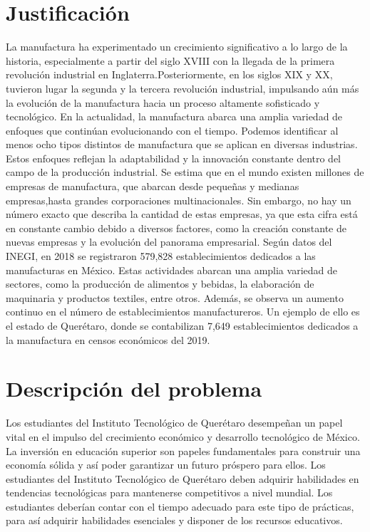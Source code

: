    
    \section{Justificación}
    La manufactura ha experimentado un crecimiento significativo a lo largo de la historia, especialmente a partir del siglo XVIII con la llegada de la primera revolución industrial en Inglaterra.Posteriormente, en los siglos XIX y XX, tuvieron lugar la segunda y la tercera revolución industrial, impulsando aún más la evolución de la manufactura hacia un proceso altamente sofisticado y tecnológico. En la actualidad, la manufactura abarca una amplia variedad de enfoques que continúan evolucionando con el tiempo. Podemos identificar al menos ocho tipos distintos de manufactura que se aplican en diversas industrias. Estos enfoques reflejan la adaptabilidad y la innovación constante dentro del campo de la producción industrial. \cite{Revoluciónindustrial}
    Se estima que en el mundo existen millones de empresas de manufactura, que abarcan desde pequeñas y medianas empresas,hasta grandes corporaciones multinacionales. Sin embargo, no hay un número exacto que describa la cantidad de estas empresas, ya que esta cifra está en constante cambio debido a diversos factores, como la creación constante de nuevas empresas y la evolución del panorama empresarial.
    Según datos del INEGI, en 2018 se registraron 579,828 establecimientos dedicados a las manufacturas en México. Estas actividades abarcan una amplia variedad de sectores, como la producción de alimentos y bebidas, la elaboración de maquinaria y productos textiles, entre otros. \cite{Cuéntamedemexico}
    Además, se observa un aumento continuo en el número de establecimientos manufactureros. Un ejemplo de ello es el estado de Querétaro, donde se contabilizan 7,649 establecimientos dedicados a la manufactura en censos económicos del 2019.
    \section{Descripción del problema}
    Los estudiantes del Instituto Tecnológico de Querétaro desempeñan un papel vital en el impulso del crecimiento económico y desarrollo tecnológico de México. La inversión en educación superior son papeles fundamentales para construir una economía sólida y así poder garantizar un futuro próspero para ellos.
    Los estudiantes del Instituto Tecnológico de Querétaro deben adquirir habilidades en tendencias tecnológicas para mantenerse competitivos a nivel mundial.
    Los estudiantes deberían contar con el tiempo adecuado para este tipo de prácticas, para así adquirir habilidades esenciales y disponer de los recursos educativos. 
